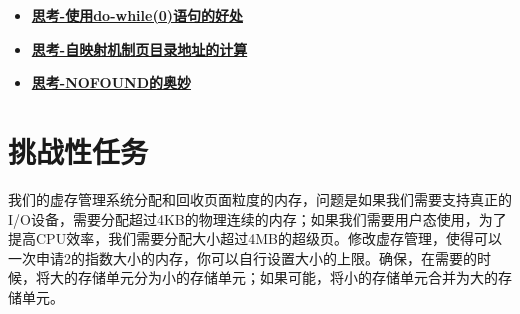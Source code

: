 \begin{itemize}
\item \hyperref[think-do_while]{\textbf{\textcolor{baseB}{思考-使用do-while(0)语句的好处}}}
\item \hyperref[think-windows_pde_addr]{\textbf{\textcolor{baseB}{思考-自映射机制页目录地址的计算}}}
\item \hyperref[think-tlb]{\textbf{\textcolor{baseB}{思考-NOFOUND的奥妙}}}
\end{itemize}

\section{挑战性任务}

我们的虚存管理系统分配和回收页面粒度的内存，问题是如果我们需要支持真正的I/O设备，需要分配超过4KB的物理连续的内存；如果我们需要用户态使用，为了提高CPU效率，我们需要分配大小超过4MB的超级页。修改虚存管理，使得可以一次申请2的指数大小的内存，你可以自行设置大小的上限。确保，在需要的时候，将大的存储单元分为小的存储单元；如果可能，将小的存储单元合并为大的存储单元。
